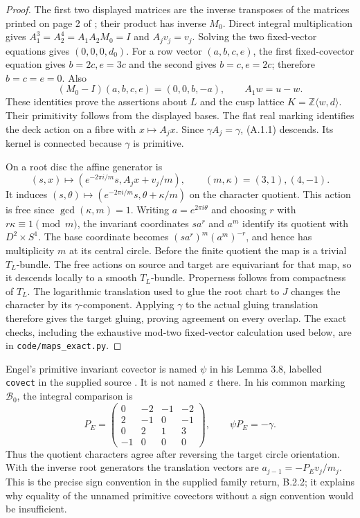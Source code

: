 \begin{proof}
The first two displayed matrices are the inverse transposes of
the matrices printed on page 2 of \cite{mapsAC26}; their product
has inverse $M_0$.  Direct integral multiplication gives
$A_1^3=A_2^4=A_1A_2M_0=I$ and $A_jv_j=v_j$.
Solving the two fixed-vector equations gives $(0,0,0,d_0)$.
For a row vector $(a,b,c,e)$, the first fixed-covector equation
gives $b=2c,e=3c$ and the second gives $b=c,e=2c$;
therefore $b=c=e=0$.  Also
\[
 (M_0-I)(a,b,c,e)=(0,0,b,-a),\qquad
 A_1w=u-w.
\]
These identities prove the assertions about $L$ and the cusp
lattice $K=\mathbb Z\langle w,d\rangle$.  Their primitivity follows
from the displayed bases.  The flat real marking identifies the
deck action on a fibre with $x\mapsto A_jx$.  Since
$\gamma A_j=\gamma$, (A.1.1) descends.  Its kernel is connected
because $\gamma$ is primitive.

On a root disc the affine generator is
\[
 (s,x)\longmapsto
 (e^{-2\pi i/m}s,A_jx+v_j/m),\qquad (m,\kappa)=(3,1),(4,-1).
\]
It induces $(s,\theta)\mapsto
(e^{-2\pi i/m}s,\theta+\kappa/m)$ on the character quotient.
This action is free since $\gcd(\kappa,m)=1$.  Writing
$a=e^{2\pi i\theta}$ and choosing $r$ with $r\kappa\equiv1\pmod m$,
the invariant coordinates $s a^r$ and $a^m$ identify its quotient
with $D^2\times S^1$.  The base coordinate becomes
$(s a^r)^m(a^m)^{-r}$, and hence has multiplicity $m$ at its
central circle.  Before the finite quotient the map is a trivial
$T_L$-bundle.  The free actions on source and target are
equivariant for that map, so it descends locally to a smooth
$T_L$-bundle.  Properness follows from compactness of $T_L$.
The logarithmic translation used to glue the root chart to $J$
changes the character by its $\gamma$-component.  Applying
$\gamma$ to the actual gluing translation therefore gives the
target gluing, proving agreement on every overlap.
The exact checks, including the exhaustive mod-two fixed-vector
calculation used below, are in \texttt{code/maps\_exact.py}.
\end{proof}


Engel's primitive invariant covector is named $\psi$ in his
Lemma 3.8, labelled \texttt{covect} in the supplied source
\cite{mapsEngel}.  It is not named $\varepsilon$ there.  In his
common marking $\mathcal B_0$, the integral comparison is
\[
 P_E=\begin{pmatrix}0&-2&-1&-2\\2&-1&0&-1\\0&2&1&3\\-1&0&0&0\end{pmatrix},
 \qquad \psi P_E=-\gamma.
 \tag{A.1.2}
\]
Thus the quotient characters agree after reversing the target
circle orientation.  With the inverse root generators the
translation vectors are $a_{j-1}=-P_Ev_j/m_j$.
This is the precise sign convention in the supplied family
return, B.2.2; it explains why equality of the unnamed primitive
covectors without a sign convention would be insufficient.

